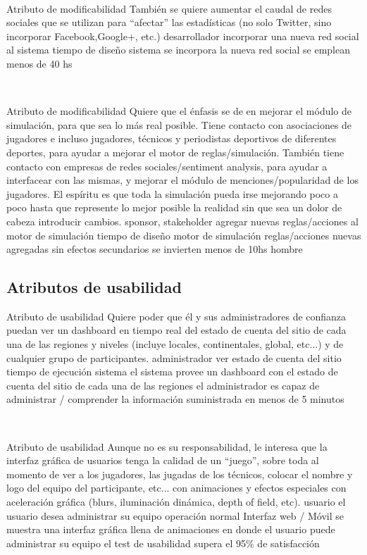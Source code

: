 ~

\escenario
{Atributo de modificabilidad}
{También se quiere aumentar el caudal de redes sociales que se utilizan para “afectar” las estadísticas (no solo Twitter, sino incorporar Facebook,Google+, etc.)}
{desarrollador}
{incorporar una nueva red social al sistema}
{tiempo de diseño}
{sistema}
{se incorpora la nueva red social}
{se emplean menos de 40 hs}

~

\escenario
{Atributo de modificabilidad}
{Quiere que el énfasis se de en mejorar el módulo de simulación, para que sea lo más real
posible. Tiene contacto con asociaciones de jugadores e incluso jugadores, técnicos y
periodistas deportivos de diferentes deportes, para ayudar a mejorar el motor de
reglas/simulación. También tiene contacto con empresas de redes sociales/sentiment
analysis, para ayudar a interfacear con las mismas, y mejorar el módulo de
menciones/popularidad de los jugadores. El espíritu es que toda la simulación pueda irse
mejorando poco a poco hasta que represente lo mejor posible la realidad sin que sea un
dolor de cabeza introducir cambios.}
{sponsor, stakeholder}
{agregar nuevas reglas/acciones al motor de simulación}
{tiempo de diseño}
{motor de simulación}
{reglas/acciones nuevas agregadas sin efectos secundarios}
{se invierten menos de 10hs hombre}


\subsection{Atributos de usabilidad}

\escenario
{Atributo de usabilidad}
{Quiere poder que él y sus administradores de confianza puedan ver un dashboard en
tiempo real del estado de cuenta del sitio de cada una de las regiones y niveles (incluye locales, continentales, global, etc...) y de cualquier grupo de participantes.}
{administrador}
{ver estado de cuenta del sitio}
{tiempo de ejecución}
{sistema}
{el sistema provee un dashboard con el estado de cuenta del sitio de cada una de las regiones}
{el administrador es capaz de administrar / comprender la información suministrada en menos de 5 minutos}

~

\escenario
{Atributo de usabilidad}
{Aunque no es su responsabilidad, le interesa que la interfaz gráfica de usuarios tenga la
calidad de un “juego”, sobre toda al momento de ver a los jugadores, las jugadas de los
técnicos, colocar el nombre y logo del equipo del participante, etc... con animaciones y
efectos especiales con aceleración gráfica (blurs, iluminación dinámica, depth of field, etc).}
{usuario}
{el usuario desea administrar su equipo}
{operación normal}
{Interfaz web / Móvil}
{se muestra una interfaz gráfica llena de animaciones en donde el usuario puede administrar su equipo }
{el test de usabilidad supera el 95\% de satisfacción}

